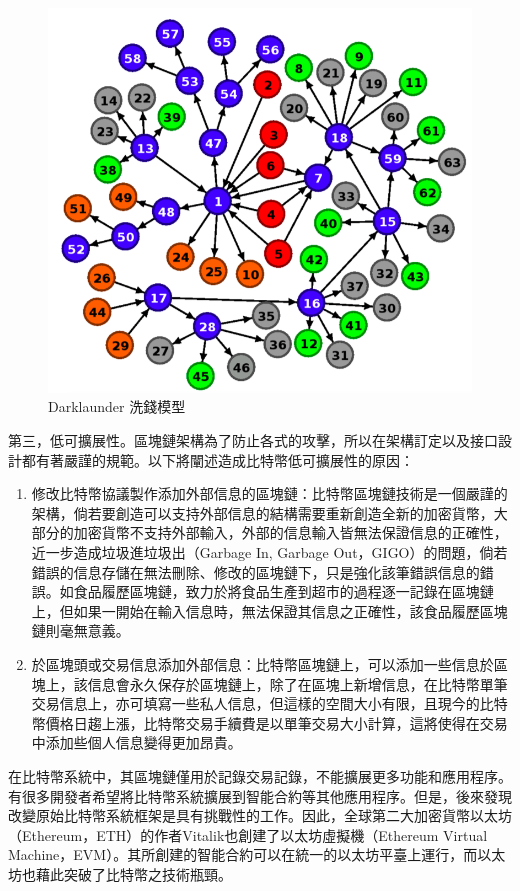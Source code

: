 					\begin{figure}[!htbp]
						\centering
						\includegraphics[width = .6\textwidth]{Darklaunderworkflow.png}
						\caption{Darklaunder 洗錢模型\supercite{AnAnalysisofBitcoinLaundryServices}}\label{Darklaunderworkflow}
					\end{figure}

				第三，低可擴展性。區塊鏈架構為了防止各式的攻擊，所以在架構訂定以及接口設計都有著嚴謹的規範。以下將闡述造成比特幣低可擴展性的原因：

					\begin{enumerate}

						\item 修改比特幣協議製作添加外部信息的區塊鏈：比特幣區塊鏈技術是一個嚴謹的架構，倘若要創造可以支持外部信息的結構需要重新創造全新的加密貨幣，大部分的加密貨幣不支持外部輸入，外部的信息輸入皆無法保證信息的正確性，近一步造成垃圾進垃圾出（Garbage In, Garbage Out，GIGO）的問題，倘若錯誤的信息存儲在無法刪除、修改的區塊鏈下，只是強化該筆錯誤信息的錯誤。如食品履歷區塊鏈，致力於將食品生產到超市的過程逐一記錄在區塊鏈上，但如果一開始在輸入信息時，無法保證其信息之正確性，該食品履歷區塊鏈則毫無意義。

						\item 於區塊頭或交易信息添加外部信息：比特幣區塊鏈上，可以添加一些信息於區塊上，該信息會永久保存於區塊鏈上，除了在區塊上新增信息，在比特幣單筆交易信息上，亦可填寫一些私人信息，但這樣的空間大小有限，且現今的比特幣價格日趨上漲，比特幣交易手續費是以單筆交易大小計算，這將使得在交易中添加些個人信息變得更加昂貴。

					\end{enumerate}

				在比特幣系統中，其區塊鏈僅用於記錄交易記錄，不能擴展更多功能和應用程序。有很多開發者希望將比特幣系統擴展到智能合約等其他應用程序。但是，後來發現改變原始比特幣系統框架是具有挑戰性的工作。因此，全球第二大加密貨幣以太坊（Ethereum，ETH）的作者Vitalik也創建了以太坊虛擬機（Ethereum Virtual Machine，EVM）。其所創建的智能合約可以在統一的以太坊平臺上運行，而以太坊也藉此突破了比特幣之技術瓶頸。
	
